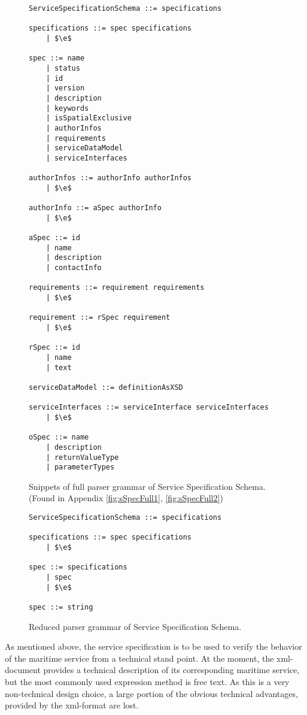 \begin{figure}
	\centering
	\begin{lstlisting}[keywordstyle={}]
ServiceSpecificationSchema ::= specifications

specifications ::= spec specifications
    | $\e$
     
spec ::= name
    | status
    | id
    | version
    | description
    | keywords
    | isSpatialExclusive
    | authorInfos
    | requirements
    | serviceDataModel
    | serviceInterfaces
     
authorInfos ::= authorInfo authorInfos
    | $\e$

authorInfo ::= aSpec authorInfo
    | $\e$

aSpec ::= id
    | name
    | description
    | contactInfo

requirements ::= requirement requirements
    | $\e$

requirement ::= rSpec requirement
    | $\e$

rSpec ::= id
    | name
    | text

serviceDataModel ::= definitionAsXSD

serviceInterfaces ::= serviceInterface serviceInterfaces
    | $\e$

oSpec ::= name
    | description
    | returnValueType
    | parameterTypes
	\end{lstlisting}
	\caption{Snippets of full parser grammar of Service Specification Schema. (Found in Appendix \ref{fig:sSpecFull1}, \ref{fig:sSpecFull2})}
	\label{fig:sSpecFull}
\end{figure}

\begin{figure}
	\centering
	\begin{lstlisting}[keywordstyle={}]
ServiceSpecificationSchema ::= specifications

specifications ::= spec specifications
    | $\e$
     
spec ::= specifications
    | spec
    | $\e$

spec ::= string
	\end{lstlisting}
	\caption{Reduced parser grammar of Service Specification Schema.}
	\label{fig:sSpecRed}
\end{figure}

As mentioned above, the service specification is to be used to verify the behavior of the maritime service from a technical stand point. At the moment, the xml-document provides a technical description of its corresponding maritime service, but the most commonly used expression method is free text. As this is a very non-technical design choice, a large portion of the obvious technical advantages, provided by the xml-format are lost. 

